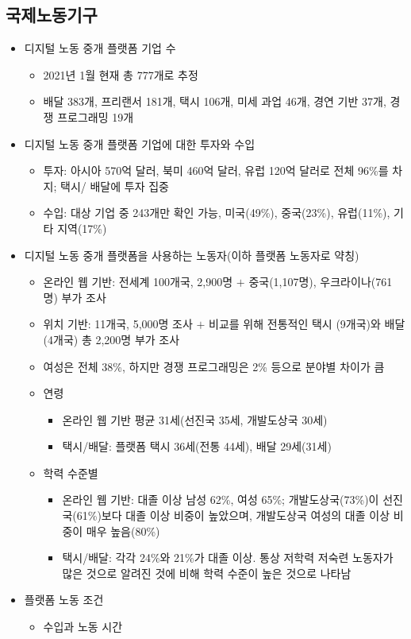 \subsection{국제노동기구}
\begin{itemize}
\item 디지털 노동 중개 플랫폼 기업 수 \citep{International-Labour-Office:2021uk}
	\begin{itemize}
	\item 2021년 1월 현재 총 777개로 추정
	\item 배달 383개, 프리랜서 181개, 택시 106개, 미세 과업 46개, 경연 기반 37개, 경쟁 프로그래밍 19개
	\end{itemize}
\item 디지털 노동 중개 플랫폼 기업에 대한 투자와 수입
	\begin{itemize}
	\item 투자: 아시아 570억 달러, 북미 460억 달러, 유럽 120억 달러로 전체 96\%를 차지; 택시/ 배달에 투자 집중
	\item 수입: 대상 기업 중 243개만 확인 가능, 미국(49\%), 중국(23\%), 유럽(11\%), 기타 지역(17\%)
	\end{itemize}
\item 디지털 노동 중개 플랫폼을 사용하는 노동자(이하 플랫폼 노동자로 약칭)
	\begin{itemize}
	\item 온라인 웹 기반: 전세계 100개국, 2,900명 $+$ 중국(1,107명), 우크라이나(761명) 부가 조사
	\item 위치 기반: 11개국, 5,000명 조사 $+$ 비교를 위해 전통적인 택시 (9개국)와 배달(4개국) 총 2,200명 부가 조사
	\item 여성은 전체 38\%, 하지만 경쟁 프로그래밍은 2\% 등으로 분야별 차이가 큼
	\item 연령
		\begin{itemize}
		\item 온라인 웹 기반 평균 31세(선진국 35세, 개발도상국 30세)
		\item 택시/배달: 플랫폼 택시 36세(전통 44세), 배달 29세(31세)
		\end{itemize}
	\item 학력 수준별
		\begin{itemize}
		\item 온라인 웹 기반: 대졸 이상 남성 62\%, 여성 65\%; 개발도상국(73\%)이 선진국(61\%)보다 대졸 이상 비중이 높았으며, 개발도상국 여성의 대졸 이상 비중이 매우 높음(80\%)
		\item 택시/배달: 각각 24\%와 21\%가 대졸 이상. 통상 저학력 저숙련 노동자가 많은 것으로 알려진 것에 비해 학력 수준이 높은 것으로 나타남
		\end{itemize}
	\end{itemize}
\item 플랫폼 노동 조건
	\begin{itemize}
	\item 수입과 노동 시간
	

\end{itemize}
\end{itemize}
